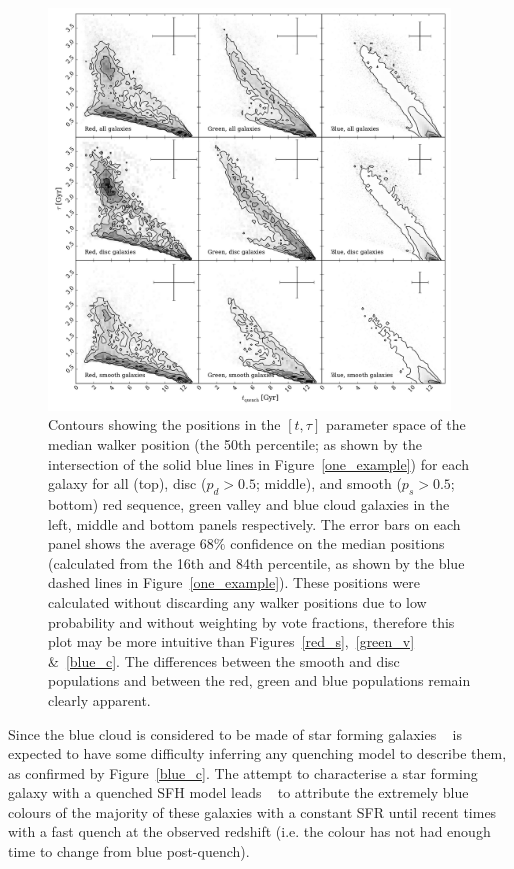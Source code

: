 \begin{figure}
\includegraphics[width=0.95\textwidth]{morphology/contour_t_tau_mcmc_bestfit.pdf}
\caption[Best fit contours for red, green and blue clean galaxies]{Contours showing the positions in the $[t, \tau]$ parameter space of the median walker position (the 50th percentile; as shown by the intersection of the solid blue lines in Figure~\ref{one_example}) for each galaxy for all (top), disc ($p_d > 0.5$; middle), and smooth ($p_s > 0.5$; bottom) red sequence, green valley and blue cloud galaxies in the left, middle and bottom panels respectively. The error bars on each panel shows the average $68\%$ confidence on the median positions (calculated from the 16th and 84th percentile, as shown by the blue dashed lines in Figure~\ref{one_example}). These positions were calculated without discarding any walker positions due to low probability and without weighting by vote fractions, therefore this plot may be more intuitive than Figures~\ref{red_s},~\ref{green_v} \&~\ref{blue_c}. The differences between the smooth and disc populations and between the red, green and blue populations remain clearly apparent.}
\label{fig:bestfit}
\end{figure}

Since the blue cloud is considered to be made of star forming galaxies \starpy~ is expected to have some difficulty inferring any quenching model to describe them, as confirmed by Figure~\ref{blue_c}. The attempt to characterise a star forming galaxy with a quenched SFH model leads \starpy~ to attribute the extremely blue colours of the majority of these galaxies with a constant SFR until recent times with a fast quench at the observed redshift (i.e. the colour has not had enough time to change from blue post-quench). 

